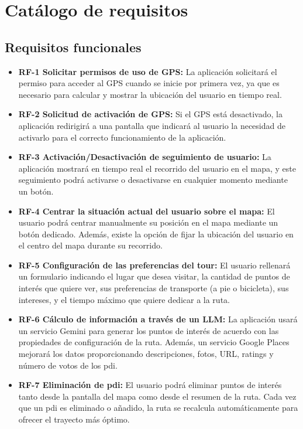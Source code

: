 \section{Catálogo de requisitos}
\subsection{Requisitos funcionales}
\begin{itemize}
	\item \textbf{RF-1 Solicitar permisos de uso de GPS:} La aplicación solicitará el permiso para acceder al GPS cuando se inicie por primera vez, ya que es necesario para calcular y mostrar la ubicación del usuario en tiempo real.
	
	\item \textbf{RF-2 Solicitud de activación de GPS:} Si el GPS está desactivado, la aplicación redirigirá a una pantalla que indicará al usuario la necesidad de activarlo para el correcto funcionamiento de la aplicación.
	
	\item \textbf{RF-3 Activación/Desactivación de seguimiento de usuario:} La aplicación mostrará en tiempo real el recorrido del usuario en el mapa, y este seguimiento podrá activarse o desactivarse en cualquier momento mediante un botón.
	
	\item \textbf{RF-4 Centrar la situación actual del usuario sobre el mapa:} El usuario podrá centrar manualmente su posición en el mapa mediante un botón dedicado. Además, existe la opción de fijar la ubicación del usuario en el centro del mapa durante su recorrido.
	
	\item \textbf{RF-5 Configuración de las preferencias del tour:} El usuario rellenará un formulario indicando el lugar que desea visitar, la cantidad de puntos de interés que quiere ver, sus preferencias de transporte (a pie o bicicleta), sus intereses, y el tiempo máximo que quiere dedicar a la ruta.
	
	\item \textbf{RF-6 Cálculo de información a través de un LLM:} La aplicación usará un servicio Gemini para generar los puntos de interés de acuerdo con las propiedades de configuración de la ruta. Además, un servicio Google Places mejorará los datos proporcionando descripciones, fotos, URL, ratings y número de votos de los \acrshort{pdi}.
	
	\item \textbf{RF-7 Eliminación de \acrshort{pdi}:} El usuario podrá eliminar puntos de interés tanto desde la pantalla del mapa como desde el resumen de la ruta. Cada vez que un \acrshort{pdi} es eliminado o añadido, la ruta se recalcula automáticamente para ofrecer el trayecto más óptimo.
	

\end{itemize}
